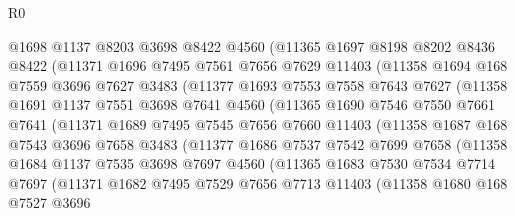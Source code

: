 \begin{lexlean}{R0}
\begin{coremodule}
          @1698
          @1137
          @8203
          @3698
          @8422
          @4560
          (@11365
            @1697
            @8198
            @8202
            @8436
            @8422
            (@11371
              @1696
              @7495
              @7561
              @7656
              @7629
              @11403
              (@11358
                @1694
                @168
                @7559
                @3696
                @7627
                @3483
                (@11377
                  @1693
                  @7553
                  @7558
                  @7643
                  @7627
                  (@11358
                    @1691
                    @1137
                    @7551
                    @3698
                    @7641
                    @4560
                    (@11365
                      @1690
                      @7546
                      @7550
                      @7661
                      @7641
                      (@11371
                        @1689
                        @7495
                        @7545
                        @7656
                        @7660
                        @11403
                        (@11358
                          @1687
                          @168
                          @7543
                          @3696
                          @7658
                          @3483
                          (@11377
                            @1686
                            @7537
                            @7542
                            @7699
                            @7658
                            (@11358
                              @1684
                              @1137
                              @7535
                              @3698
                              @7697
                              @4560
                              (@11365
                                @1683
                                @7530
                                @7534
                                @7714
                                @7697
                                (@11371
                                  @1682
                                  @7495
                                  @7529
                                  @7656
                                  @7713
                                  @11403
                                  (@11358
                                    @1680
                                    @168
                                    @7527
                                    @3696

\end{coremodule}
\end{lexlean}
